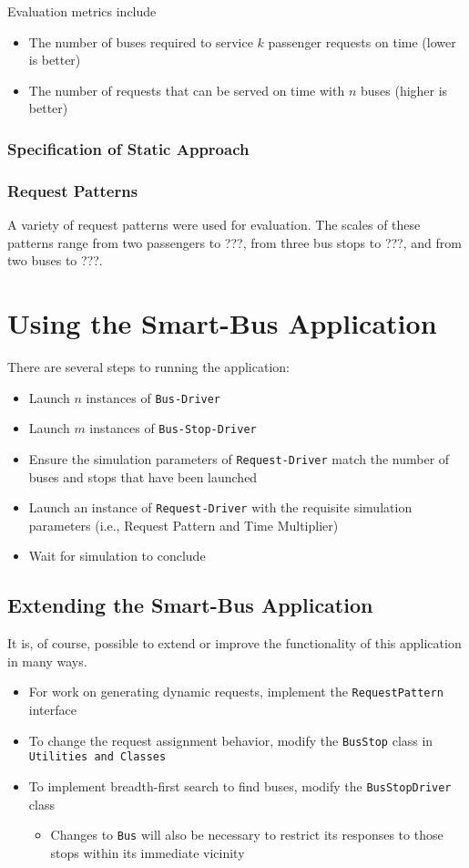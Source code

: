 \documentclass[runningheads]{llncs}
\begin{document}
Evaluation metrics include
\begin{itemize}
	\item The number of buses required to service $k$ passenger requests on time (lower is better)
	\item The number of requests that can be served on time with $n$ buses (higher is better)
\end{itemize}

\subsubsection{Specification of Static Approach}

\subsubsection{Request Patterns}
A variety of request patterns were used for evaluation. The scales of these patterns range from two passengers to ???, from three bus stops to ???, and from two buses to ???.

\section{Using the Smart-Bus Application}
There are several steps to running the application:
\begin{itemize}
	\item Launch $n$ instances of \lstinline{Bus-Driver}
	\item Launch $m$ instances of \lstinline{Bus-Stop-Driver}
	\item Ensure the simulation parameters of \lstinline{Request-Driver} match the number of buses and stops that have been launched
	\item Launch an instance of \lstinline{Request-Driver} with the requisite simulation parameters (i.e., Request Pattern and Time Multiplier)
	\item Wait for simulation to conclude
\end{itemize} 

\subsection{Extending the Smart-Bus Application}
It is, of course, possible to extend or improve the functionality of this application in many ways.
\begin{itemize}
	\item For work on generating dynamic requests, implement the \lstinline{RequestPattern} interface 
	\item To change the request assignment behavior, modify the \lstinline{BusStop} class in \lstinline{Utilities and Classes}
	\item To implement breadth-first search to find buses, modify the \lstinline{BusStopDriver} class
	\begin{itemize}
		\item Changes to \lstinline{Bus} will also be necessary to restrict its responses to those stops within its immediate vicinity
	\end{itemize}
\end{itemize}
\end{document}
